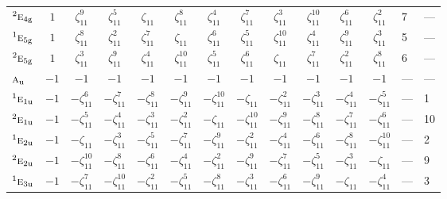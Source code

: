 \documentclass[10pt,a4paper]{article}
\numberwithin{equation}{section}
\newcommand{\irr}[1]{\text{\normalfont\scshape #1}}
\newcommand{\conjpair}[1]{{}^{#1}}
\newcommand{\ptag}[1]{\mathrm{#1}}
\newcommand{\rootunity}[1]{\zeta_{#1}}
\begin{document}
{\begin{longtable}{@{}lcccccccccccll@{}}
$\conjpair{2}\irr{e}_{4\ptag{g}}$ & $1$ & $\rootunity{11}^{9}$ & $\rootunity{11}^{5}$ & $\rootunity{11}$ & $\rootunity{11}^{8}$ & $\rootunity{11}^{4}$ & $\rootunity{11}^{7}$ & $\rootunity{11}^{3}$ & $\rootunity{11}^{10}$ & $\rootunity{11}^{6}$ & $\rootunity{11}^{2}$ & 7 & ---\\
$\conjpair{1}\irr{e}_{5\ptag{g}}$ & $1$ & $\rootunity{11}^{8}$ & $\rootunity{11}^{2}$ & $\rootunity{11}^{7}$ & $\rootunity{11}$ & $\rootunity{11}^{6}$ & $\rootunity{11}^{5}$ & $\rootunity{11}^{10}$ & $\rootunity{11}^{4}$ & $\rootunity{11}^{9}$ & $\rootunity{11}^{3}$ & 5 & ---\\
$\conjpair{2}\irr{e}_{5\ptag{g}}$ & $1$ & $\rootunity{11}^{3}$ & $\rootunity{11}^{9}$ & $\rootunity{11}^{4}$ & $\rootunity{11}^{10}$ & $\rootunity{11}^{5}$ & $\rootunity{11}^{6}$ & $\rootunity{11}$ & $\rootunity{11}^{7}$ & $\rootunity{11}^{2}$ & $\rootunity{11}^{8}$ & 6 & ---\\
$\irr{a}_{\ptag{u}}$ & $-1$ & $-1$ & $-1$ & $-1$ & $-1$ & $-1$ & $-1$ & $-1$ & $-1$ & $-1$ & $-1$ & --- & ---\\
$\conjpair{1}\irr{e}_{1\ptag{u}}$ & $-1$ & $-\rootunity{11}^{6}$ & $-\rootunity{11}^{7}$ & $-\rootunity{11}^{8}$ & $-\rootunity{11}^{9}$ & $-\rootunity{11}^{10}$ & $-\rootunity{11}$ & $-\rootunity{11}^{2}$ & $-\rootunity{11}^{3}$ & $-\rootunity{11}^{4}$ & $-\rootunity{11}^{5}$ & --- & 1\\
$\conjpair{2}\irr{e}_{1\ptag{u}}$ & $-1$ & $-\rootunity{11}^{5}$ & $-\rootunity{11}^{4}$ & $-\rootunity{11}^{3}$ & $-\rootunity{11}^{2}$ & $-\rootunity{11}$ & $-\rootunity{11}^{10}$ & $-\rootunity{11}^{9}$ & $-\rootunity{11}^{8}$ & $-\rootunity{11}^{7}$ & $-\rootunity{11}^{6}$ & --- & 10\\
$\conjpair{1}\irr{e}_{2\ptag{u}}$ & $-1$ & $-\rootunity{11}$ & $-\rootunity{11}^{3}$ & $-\rootunity{11}^{5}$ & $-\rootunity{11}^{7}$ & $-\rootunity{11}^{9}$ & $-\rootunity{11}^{2}$ & $-\rootunity{11}^{4}$ & $-\rootunity{11}^{6}$ & $-\rootunity{11}^{8}$ & $-\rootunity{11}^{10}$ & --- & 2\\
$\conjpair{2}\irr{e}_{2\ptag{u}}$ & $-1$ & $-\rootunity{11}^{10}$ & $-\rootunity{11}^{8}$ & $-\rootunity{11}^{6}$ & $-\rootunity{11}^{4}$ & $-\rootunity{11}^{2}$ & $-\rootunity{11}^{9}$ & $-\rootunity{11}^{7}$ & $-\rootunity{11}^{5}$ & $-\rootunity{11}^{3}$ & $-\rootunity{11}$ & --- & 9\\
$\conjpair{1}\irr{e}_{3\ptag{u}}$ & $-1$ & $-\rootunity{11}^{7}$ & $-\rootunity{11}^{10}$ & $-\rootunity{11}^{2}$ & $-\rootunity{11}^{5}$ & $-\rootunity{11}^{8}$ & $-\rootunity{11}^{3}$ & $-\rootunity{11}^{6}$ & $-\rootunity{11}^{9}$ & $-\rootunity{11}$ & $-\rootunity{11}^{4}$ & --- & 3\\

\end{longtable}}
\end{document}
